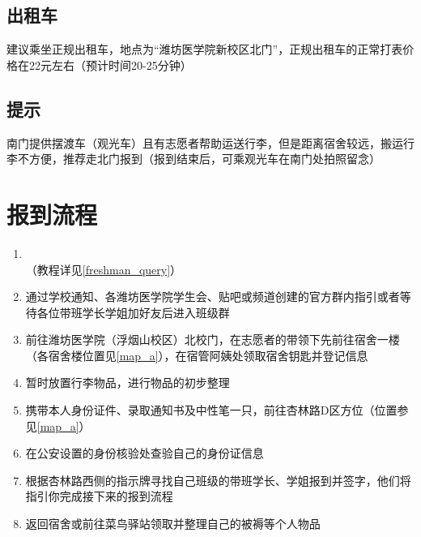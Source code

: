 \subsection[出租车]{出租车}
建议乘坐正规出租车，地点为“潍坊医学院新校区北门”，正规出租车的正常打表价格在22元左右（预计时间20-25分钟）

\subsection[提示]{提示}
南门提供摆渡车（观光车）且有志愿者帮助运送行李，但是距离宿舍较远，搬运行李不方便，推荐走北门报到（报到结束后，可乘观光车在南门处拍照留念）

\section[报到流程]{报到流程}
\begin{enumerate}
      \item \textbf{\\}\footnotemark（教程详见\uline{\ref{freshman_query}}）
      \item 通过学校通知、各潍坊医学院学生会、贴吧或频道创建的官方群内指引或者等待各位带班学长学姐加好友后进入班级群\footnotemark
      \item 前往潍坊医学院（浮烟山校区）北校门，在志愿者\footnotemark 的带领下先前往宿舍一楼（各宿舍楼位置见\uline{\ref{map_a}}），在宿管阿姨处领取宿舍钥匙并登记信息
      \item 暂时放置行李物品，进行物品的初步整理
      \item 携带本人身份证件、录取通知书\footnotemark 及中性笔一只，前往杏林路D区方位（位置参见\uline{\ref{map_a}}）
      \item 在公安设置的身份核验处查验自己的身份证\footnotemark 信息
      \item 根据杏林路西侧的指示牌寻找自己班级的带班学长、学姐报到并签字，他们将指引你完成接下来的报到流程\footnotemark
      \item 返回宿舍或前往菜鸟驿站领取并整理自己的被褥等个人物品
\end{enumerate}